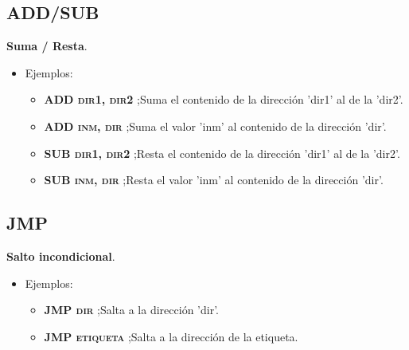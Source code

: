 \subsection{ADD/SUB}
\noindent
\textbf{Suma / Resta}.
\begin{itemize}
    \item Ejemplos:
    \begin{itemize}
        \item \textbf{\textsc{ADD dir1, dir2}} ;Suma el contenido de la dirección 'dir1' al de la 'dir2'.
        \item \textbf{\textsc{ADD inm, dir}} ;Suma el valor 'inm' al contenido de la dirección 'dir'.
        \item \textbf{\textsc{SUB dir1, dir2}} ;Resta el contenido de la dirección 'dir1' al de la 'dir2'.
        \item \textbf{\textsc{SUB inm, dir}} ;Resta el valor 'inm' al contenido de la dirección 'dir'.
    \end{itemize}
\end{itemize}

\subsection{JMP}
\noindent
\textbf{Salto incondicional}.
\begin{itemize}
    \item Ejemplos:
    \begin{itemize}
        \item \textbf{\textsc{JMP dir}} ;Salta a la dirección 'dir'.
        \item \textbf{\textsc{JMP etiqueta}} ;Salta a la dirección de la etiqueta.
    \end{itemize}
\end{itemize}